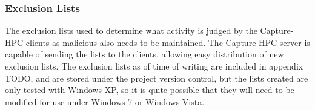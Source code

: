 \subsubsection{Exclusion Lists}

The exclusion lists used to determine what activity is judged by the Capture-HPC
clients as malicious also needs to be maintained. The Capture-HPC server is
capable of sending the lists to the clients, allowing easy distribution of new
exclusion lists. The exclusion lists as of time of writing are included in
appendix TODO, and are stored under the project version control, but the lists
created are only tested with Windows XP, so it is quite possible that they will
need to be modified for use under Windows 7 or Windows Vista.

